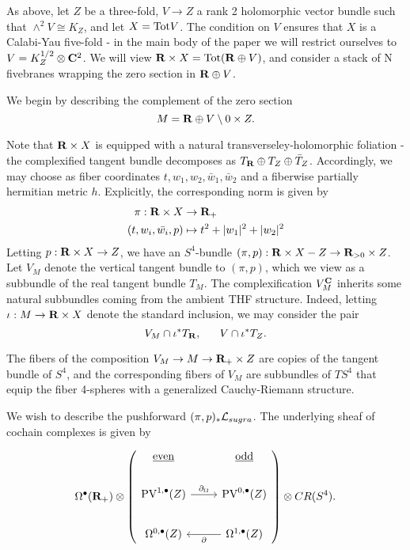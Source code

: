 \parsec

As above, let $Z$ be a three-fold, $V\to Z$ a rank 2 holomorphic vector bundle such that $\wedge^{2} V \cong K_{Z}$, and let $X = {\rm Tot}V$. The condition on $V$ ensures that $X$ is a Calabi-Yau five-fold - in the main body of the paper we will restrict ourselves to $V = K_{Z}^{1/2}\otimes \mathbf{C}^{2}$. We will view $\mathbf{R}\times X = {\rm Tot}(\mathbf{R}\oplus V)$, and consider a stack of N fivebranes wrapping the zero section in $\mathbf{R}\oplus V$.

We begin by describing the complement of the zero section
\[
M = \mathbf{R}\oplus V \setminus 0\times Z.
\]

Note that $\mathbf{R} \times X$ is equipped with a natural transverseley-holomorphic foliation - the complexified tangent bundle decomposes as $T_{\mathbf{R}}\oplus T_{Z}\oplus \bar T_{Z}$. Accordingly, we may choose as fiber coordinates $t, w_{1}, w_{2}, \bar w_{1}, \bar w_{2}$ and a fiberwise partially hermitian metric $h$. Explicitly, the corresponding norm is given by
\begin{align*}
 \pi:  \mathbf{R}\times X & \to \mathbf{R}_{+} \\
  (t, w_{i}, \bar{w_{i}}, p)& \mapsto t^{2} + |w_{1}|^{2}+|w_{2}|^{2}
\end{align*}
Letting $p : \mathbf{R}\times X \to Z$, we have an $S^{4}$-bundle $(\pi, p) : \mathbf{R}\times X - Z \to \mathbf{R}_{>0}\times Z$. Let $V_{M}$ denote the vertical tangent bundle to $(\pi, p)$, which we view as a subbundle of the real tangent bundle $T_{M}$. The complexification $V_{M}^{\mathbf{C}}$ inherits some natural subbundles coming from the ambient THF structure. Indeed, letting $\iota : M \to \mathbf{R}\times X$ denote the standard inclusion, we may consider the pair
\[
  V_{M}\cap \iota^{*} T_{\mathbf{R}}, \ \ \ \ \ V\cap \iota^{*} T_{Z}.
\]

The fibers of the composition $V_{M}\to M\to \mathbf{R}_{+}\times Z$ are copies of the tangent bundle of $S^{4}$, and the corresponding fibers of $V_{M}$ are subbundles of $TS^{4}$ that equip the fiber 4-spheres with a generalized Cauchy-Riemann structure. 

We wish to describe the pushforward $(\pi, p)_{*}\mathcal L_{sugra}$. The underlying sheaf of cochain complexes is given by

\[
\Omega^{\bullet}(\R_{+})\otimes \left ( \begin{tikzcd}
\ul{\rm even} & \ul{\rm odd} \\
\PV^{1,\bu}(Z) \ar[r, "\del_{\Omega}"] & \PV^{0,\bu}(Z)\\
\Omega^{0,\bu}(Z) & \Omega^{1,\bu}(Z) \ar[l, "\del"]
\end{tikzcd}
 \right ) \otimes CR (S^{4}).
\]


